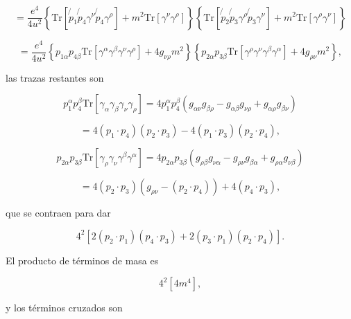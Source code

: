 \begin{equation}
= \frac{e^4}{4u^2} \left\{ \text{Tr} \left[ \not{p}_1 \not{p}_4 \gamma^\nu \not{p}_4 \gamma^\rho \right] + m^2 \text{Tr}[\gamma^\nu\gamma^\rho] \right\} \left\{ \text{Tr} \left[ \not{p}_2 \not{p}_3 \gamma^\rho \not{p}_3 \gamma^\nu \right] + m^2 \text{Tr}[\gamma^\rho\gamma^\nu] \right\}
\end{equation}

\begin{equation}
= \frac{e^4}{4u^2} \left\{ p_{1\alpha}p_{4\beta} \text{Tr}[\gamma^\alpha\gamma^\beta\gamma^\nu\gamma^\rho] + 4g_{\nu\rho}m^2 \right\} \left\{ p_{2\alpha}p_{3\beta} \text{Tr}[\gamma^\rho\gamma^\nu\gamma^\beta\gamma^\alpha] + 4g_{\rho\nu}m^2 \right\},
\end{equation}

las trazas restantes son

\begin{equation}
p_1^\alpha p_4^\beta \text{Tr}[\gamma_\alpha\gamma_\beta\gamma_\nu\gamma_\rho] = 4p_1^\alpha p_4^\beta (g_{\alpha\nu}g_{\beta\rho} - g_{\alpha\beta}g_{\nu\rho} + g_{\alpha\rho}g_{\beta\nu})
\end{equation}

\begin{equation}
= 4(p_1\cdot p_4)(p_2\cdot p_3) - 4(p_1\cdot p_3)(p_2\cdot p_4),
\end{equation}

\begin{equation}
p_{2\alpha}p_{3\beta} \text{Tr}[\gamma_\rho\gamma_\nu\gamma^\beta\gamma^\alpha] = 4p_{2\alpha}p_{3\beta}\left(g_{\rho\beta}g_{\nu\alpha} - g_{\rho\nu}g_{\beta\alpha} + g_{\rho\alpha}g_{\nu\beta}\right)
\end{equation}

\begin{equation}
= 4(p_2\cdot p_3)(g_{\rho\nu} - (p_2\cdot p_4)) + 4(p_4\cdot p_3),
\end{equation}

que se contraen para dar

\begin{equation}
4^2[2(p_2\cdot p_1)(p_4\cdot p_3) + 2(p_3\cdot p_1)(p_2\cdot p_4)].
\end{equation}

El producto de términos de masa es

\begin{equation}
4^2[4m^4],
\end{equation}

y los términos cruzados son

